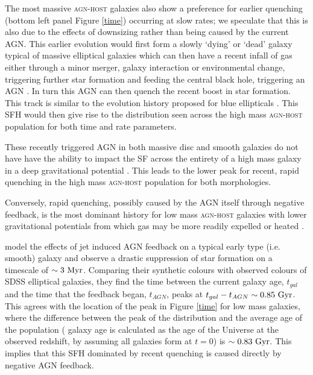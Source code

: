 \documentclass[useAMS,usenatbib]{mn2e}
\def\changed    {\color{nc} }
\def\secondchange    {\color{srv} }
\begin{document}
The most massive \textsc{agn-host} galaxies also show a preference for earlier quenching (bottom left panel Figure \ref{time}) occurring at slow rates; we speculate that this is also due to the effects of downsizing rather than being caused by the current AGN. This earlier evolution would first form a slowly `dying' or `dead' galaxy typical of massive elliptical galaxies which can then have a recent infall of gas either through a minor merger, galaxy interaction or environmental change, triggering further star formation and feeding the central black hole, triggering an AGN \citep{Kav14}. In turn this AGN can then quench the recent boost in star formation. This track is similar to the evolution history proposed for blue ellipticals \citep{Kav13, McIntosh14, Haines15}. This SFH would then give rise to the distribution seen across the high mass \textsc{agn-host} population for both time and rate parameters.


These recently triggered AGN in both massive disc and smooth galaxies do not have have the ability to impact the SF across the entirety of a high mass galaxy in a deep gravitational potential \citep{Ish12, Zinn13}. This leads to the lower peak for recent, rapid quenching in the high mass \textsc{agn-host} population for both morphologies. 

Conversely, rapid quenching, possibly caused by the AGN itself through negative feedback, is the most dominant history for low mass \textsc{agn-host} galaxies with lower gravitational potentials from which gas may be more readily expelled or heated \citep{Torbra09}. 

\cite{Torbra09} model the effects of jet induced AGN feedback on a typical early type (i.e. smooth) galaxy {\changed and observe a drastic suppression of star formation on a timescale of $\sim 3 ~\rm{Myr}$. Comparing their synthetic colours with observed colours of SDSS elliptical galaxies, they} find the time between the current galaxy age, $t_{gal}$ and the time that the feedback began, $t_{AGN}$, peaks at $t_{gal} - t_{AGN} \sim 0.85 ~\rm{Gyr}$. This agrees with the location of the peak in Figure \ref{time} for low mass galaxies, where the difference between the peak of the {\secondchange distribution} and the average age of the population ({\secondchange galaxy age is calculated as the age of the Universe at the observed redshift}, by assuming all galaxies form at $t=0$) is $\sim0.83 ~\rm{Gyr}$. This implies that this SFH dominated by recent quenching is caused directly by negative AGN feedback.
\end{document}
